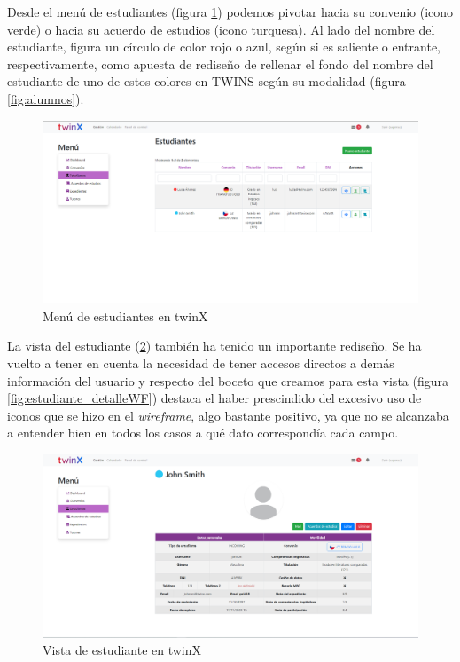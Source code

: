 Desde el menú de estudiantes (figura \ref{fig:menuestudiantestwinX}) podemos pivotar hacia su convenio (icono verde) o hacia su acuerdo de estudios (icono turquesa). Al lado del nombre del estudiante, figura un círculo de color rojo o azul, según si es saliente o entrante, respectivamente, como apuesta de rediseño de rellenar el fondo del nombre del estudiante de uno de estos colores en TWINS según su modalidad (figura \ref{fig:alumnos}).

\begin{figure}
	\centering
	\includegraphics[width=\linewidth]{Capturas de twinX/menu_estudiante}
	\caption{Menú de estudiantes en twinX}
	\label{fig:menuestudiantestwinX}
\end{figure}

La vista del estudiante (\ref{fig:vistaestudiantetwinX}) también ha tenido un importante rediseño. Se ha vuelto a tener en cuenta la necesidad de tener accesos directos a demás información del usuario y respecto del boceto que creamos para esta vista (figura \ref{fig:estudiante_detalleWF}) destaca el haber prescindido del  excesivo uso de iconos que se hizo en el \textit{wireframe}, algo bastante positivo, ya que no se alcanzaba a entender bien en todos los casos a qué dato correspondía cada campo.

\begin{figure}
	\centering
	\includegraphics[width=\linewidth]{Capturas de twinX/vista_estudiante}
	\caption{Vista de estudiante en twinX}
	\label{fig:vistaestudiantetwinX}
\end{figure}

